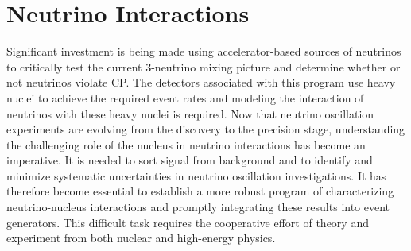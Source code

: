 \section{Neutrino Interactions}
\label{sec:Interactions}

Significant investment is being made using
accelerator-based sources of neutrinos to critically test the current
3-neutrino mixing picture and determine whether or not neutrinos
violate CP.
The detectors associated with this program use heavy nuclei to achieve
the required event rates and modeling the interaction of neutrinos
with these heavy nuclei is required.  Now that neutrino
oscillation experiments are evolving from the discovery to the
precision stage, understanding the challenging role of the nucleus in
neutrino interactions has become an imperative. It is needed to sort
signal from background and to identify and minimize systematic
uncertainties in neutrino oscillation investigations.
It has therefore become essential to establish a more robust program
of characterizing neutrino-nucleus interactions and promptly
integrating these results into event generators. This difficult task
requires the cooperative effort of theory and experiment from both
nuclear and high-energy physics.

